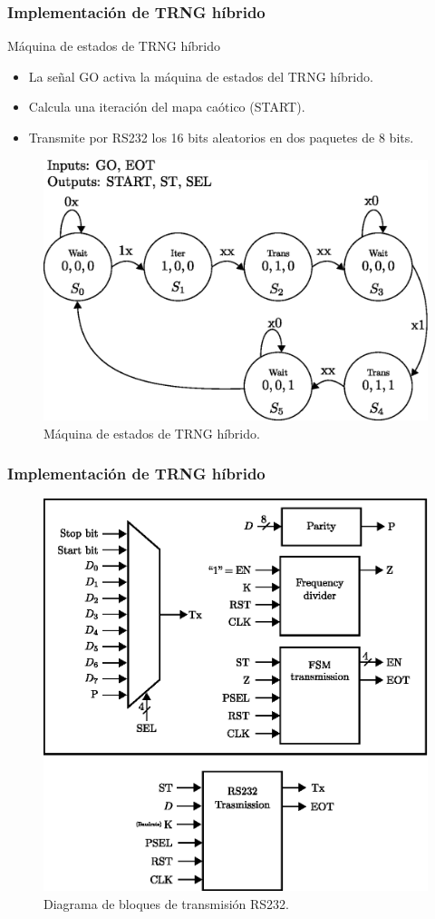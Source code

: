 \documentclass[10pt]{beamer}
\begin{document}
\begin{frame}
    \frametitle{Implementación de TRNG híbrido}
    \begin{block}{Máquina de estados de TRNG híbrido}
        \justifying
        \begin{itemize}
            \item La señal GO activa la máquina de estados del TRNG híbrido.
            \item Calcula una iteración del mapa caótico (START).
            \item Transmite por RS232 los 16 bits aleatorios en dos paquetes de 8 bits.
        \end{itemize}
	\end{block}
        \begin{figure}[hbtp]
            \centering
            \includegraphics[width=0.5\linewidth]{D1_fsm_system}
            \caption{Máquina de estados de TRNG híbrido.}
            \label{fig:D1_fsm_system}
        \end{figure}
\end{frame}

\begin{frame}
    \frametitle{Implementación de TRNG híbrido}
	\begin{figure}[hbtp]
            \centering
            \includegraphics[width=0.5\linewidth]{C1_architecture_rs232}
            \caption{Diagrama de bloques de transmisión RS232.}
            \label{fig:C1_architecture_rs232}
        \end{figure}
\end{frame}
\end{document}
